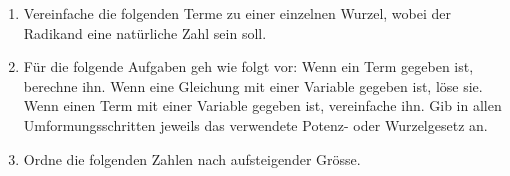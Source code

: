 \documentclass[11pt,oneside]{article}
\begin{document}
	\begin{aufgabe}
		\begin{enumerate}
			\item Vereinfache die folgenden Terme zu einer einzelnen Wurzel, wobei der Radikand eine natürliche Zahl sein soll.
			\item Für die folgende Aufgaben geh wie folgt vor: Wenn ein Term gegeben ist, berechne ihn. Wenn eine Gleichung mit einer Variable gegeben ist, löse sie. Wenn einen Term mit einer Variable gegeben ist, vereinfache ihn. Gib in allen Umformungsschritten jeweils das verwendete Potenz- oder Wurzelgesetz an.
			\item Ordne die folgenden Zahlen nach aufsteigender Grösse.
		\end{enumerate}
	\end{aufgabe}
\end{document}
